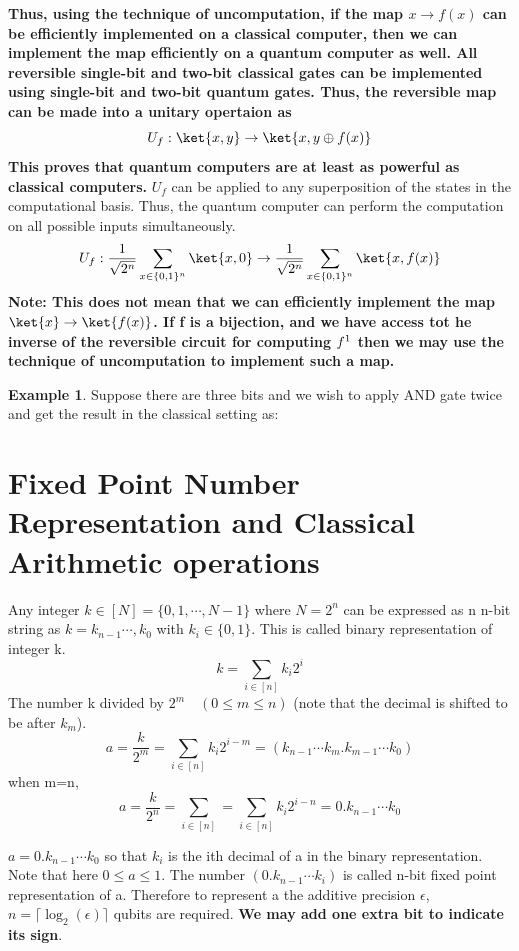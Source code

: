 \documentclass[12pt, oneside]{book}
\theoremstyle{definition}
\theoremstyle{definition}
\newtheorem{example}{Example}[section]
\theoremstyle{remark}
\begin{document}
\textbf{Thus, using the technique of uncomputation, if the map $x \rightarrow f(x)$ can be efficiently implemented on a classical computer, then we can implement the map
efficiently on a quantum computer as well. All reversible single-bit and two-bit classical gates can be implemented using single-bit and two-bit quantum gates. Thus, the reversible map can be made into a unitary opertaion as}
\[ U_f:\ket{x,y}\rightarrow\ket{x,y\oplus f(x)}\] 
\textbf{This proves that quantum computers are at least as powerful as classical computers.}
$U_f$ can be applied to any superposition of the states in the computational basis. Thus, the quantum computer can perform the computation on all possible inputs simultaneously.
\[ U_f:\frac{1}{\sqrt{2^n}}\sum_{x\in\{0,1\}^n}\ket{x,0}\rightarrow \frac{1}{\sqrt{2^n}}\sum_{x\in\{0,1\}^n}\ket{x,f(x)}\]
\textbf{Note: This does not mean that we can efficiently implement the map $\ket{x}\rightarrow \ket{f(x)}$. If f is a bijection, and we have
access tot he inverse of the reversible circuit for computing $f^{\-1}$ then we may use the technique of uncomputation to implement such a map.}
\begin{example}
    Suppose there are three bits and we wish to apply AND gate twice and get the result in the classical setting as:

\end{example}

 
\section{Fixed Point Number Representation and Classical Arithmetic operations}
Any integer $k \in [N]=\{0,1,\cdots,N-1\}$ where $N=2^n$ can be expressed as n n-bit string as
$k=k_{n-1}\cdots ,k_0$  with $k_i \in \{0,1\}$. This is called binary representation of integer k.
\[
k=\sum_{i \in [n]}k_i2^i
\]
The number k divided by $2^m \quad (0\leq m\leq n)$ (note that the decimal is shifted to be after $k_m$).
\[
a=\frac{k}{2^m}=\sum_{i\in [n]}k_i2^{i-m}=(k_{n-1}\cdots k_m.k_{m-1}\cdots k_0)\]
when m=n,
\[
a=\frac{k}{2^n}=\sum_{i\in [n]}=\sum_{i\in[n]}k_i2^{i-n}=0.k_{n-1}\cdots k_0
\]
 
$a=0.k_{n-1}\cdots k_0$ so that $k_i$ is the ith decimal of a in the binary representation. Note that here $0\leq a\leq 1$.
The number $(0.k_{n-1}\cdots k_i)$ is called n-bit fixed point representation of a. Therefore to represent a the additive precision $\epsilon$,
$n=\lceil\log_2(\epsilon)\rceil$ qubits are required. \textbf{We may add one extra bit to indicate its sign}.
 
\end{document}
